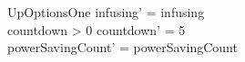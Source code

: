 \begin{schema}{UpOptionsOne}
	infusing' = infusing\\
	countdown > 0 \land countdown' = 5\\
	powerSavingCount' = powerSavingCount\\ 
\end{schema}

